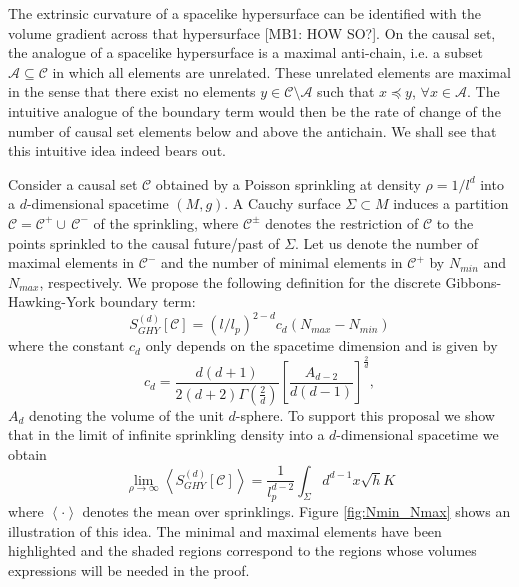 \documentclass[12pt]{article}
\newcommand{\be}{\begin{equation}}
\newcommand{\ee}{\end{equation}}
\begin{document}
The extrinsic curvature of a spacelike hypersurface can be identified with the volume gradient across that hypersurface [MB1: HOW SO?]. On the causal set, the analogue of a spacelike hypersurface is a maximal anti-chain, i.e. a subset $\mathcal{A}\subseteq\mathcal{C}$ in which all elements are unrelated. These unrelated elements are maximal in the sense that there exist no elements $y\in\mathcal{C}\setminus\mathcal{A}$ such that $x\preceq y$, $\forall x\in\mathcal{A}$. The intuitive analogue of the boundary term would then be the rate of change of the number of causal set elements below and above the antichain. We shall see that this intuitive idea indeed bears out.

Consider a causal set $\mathcal C$ obtained by a Poisson sprinkling at density $\rho=1/l^d$ into a $d$-dimensional spacetime $(M,g)$. A Cauchy surface $\Sigma\subset M$ induces a partition $\mathcal C = \mathcal C^+ \cup\, \mathcal C^-$ of the sprinkling, where $\mathcal C^\pm$ denotes the restriction of $\mathcal C$ to the points sprinkled to the causal future/past of $\Sigma$. Let us denote the number of maximal elements in $\mathcal C^-$ and the number of minimal elements in $\mathcal C^+$ by $N_{min}$ and $N_{max}$, respectively. We propose the following definition for the discrete Gibbons-Hawking-York boundary term:
\be\label{GH_boundary_to_causet}
S^{(d)}_{GHY}[\mathcal C]=\left(l/l_p\right)^{2-d}c_{d}(N_{max}-N_{min})
\ee
where the constant $c_{d}$ only depends on the spacetime dimension and is given by
\be\label{Cn}
c_{d}=\frac{d(d+1)}{2(d+2)\Gamma\left(\frac{2}{d}\right)}\left[\frac{A_{d-2}}{d(d-1)}\right]^{\frac{2}{d}},
\ee
$A_d$ denoting the volume of the unit $d$-sphere. To support this proposal we show that in the limit of infinite sprinkling density into a $d$-dimensional spacetime we obtain
\be
\lim_{\rho\rightarrow\infty}\left\langle S^{(d)}_{GHY}[\mathcal C] \right\rangle= \frac{1}{l_p^{d-2}}\int_{\Sigma} d^{d-1}x \sqrt{h} K\label{eq:mainconjecture}
\ee
where $\left\langle\cdot\right\rangle$ denotes the mean over sprinklings. Figure \ref{fig:Nmin_Nmax} shows an illustration of this idea. The minimal and maximal elements have been highlighted and the shaded regions correspond to the regions whose volumes expressions will be needed in the proof.
\end{document}
